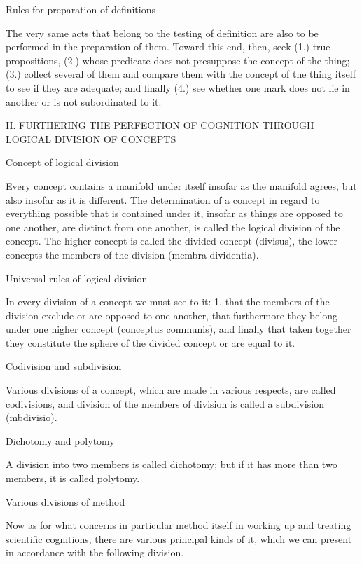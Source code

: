     Rules for preparation of definitions

    The very same acts that belong to the testing of definition are
    also to be performed in the preparation of them.
    Toward this end, then, seek
    (1.) true propositions,
    (2.) whose predicate does not presuppose the concept of the thing;
    (3.) collect several of them and compare them with the concept of
    the thing itself to see if they are adequate; and finally
    (4.) see whether one mark does not lie in another or is not subordinated to it.

    II. FURTHERING THE PERFECTION OF COGNITION
    THROUGH LOGICAL DIVISION OF CONCEPTS

    Concept of logical division

    Every concept contains a manifold under itself insofar as the manifold agrees,
    but also insofar as it is different.
    The determination of a concept in regard to everything possible
    that is contained under it, insofar as things are opposed to one another,
    are distinct from one another, is called the logical division of the concept.
    The higher concept is called the divided concept (divisus),
    the lower concepts the members of the division (membra dividentia).

    Universal rules of logical division

    In every division of a concept we must see to it:
    1. that the members of the division exclude or are opposed to one another,
    that furthermore they belong under one higher concept (conceptus communis),
    and finally that taken together they constitute the sphere of
    the divided concept or are equal to it.

    Codivision and subdivision

    Various divisions of a concept, which are made in various respects, are
    called codivisions, and division of the members of division is called a
    subdivision (mbdivisio).

    Dichotomy and polytomy

    A division into two members is called dichotomy; but if it has more than two
    members, it is called polytomy.

    Various divisions of method

    Now as for what concerns in particular method itself in working up and
    treating scientific cognitions, there are various principal kinds of it,
    which we can present in accordance with the following division.

